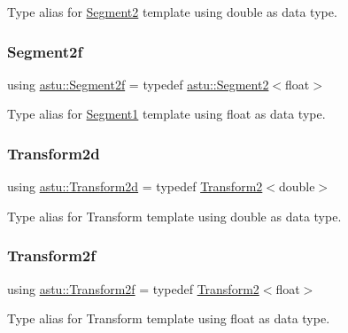 Type alias for \hyperlink{classastu_1_1Segment2}{Segment2} template using double as data type. \mbox{\label{group__math__group_gab93de73c36660369f18786b88125e902}} 
\subsubsection{\texorpdfstring{Segment2f}{Segment2f}}
{\footnotesize\ttfamily using \hyperlink{group__math__group_gab93de73c36660369f18786b88125e902}{astu\+::\+Segment2f} = typedef \hyperlink{classastu_1_1Segment2}{astu\+::\+Segment2}$<$float$>$}

Type alias for \hyperlink{classastu_1_1Segment1}{Segment1} template using float as data type. \mbox{\label{group__math__group_ga65979825a2f2857cba98d2d54a1df913}} 
\subsubsection{\texorpdfstring{Transform2d}{Transform2d}}
{\footnotesize\ttfamily using \hyperlink{group__math__group_ga65979825a2f2857cba98d2d54a1df913}{astu\+::\+Transform2d} = typedef \hyperlink{classastu_1_1Transform2}{Transform2}$<$double$>$}

Type alias for Transform template using double as data type. \mbox{\label{group__math__group_gac67b5e9d27308a01ea8190ecb15e08fa}} 
\subsubsection{\texorpdfstring{Transform2f}{Transform2f}}
{\footnotesize\ttfamily using \hyperlink{group__math__group_gac67b5e9d27308a01ea8190ecb15e08fa}{astu\+::\+Transform2f} = typedef \hyperlink{classastu_1_1Transform2}{Transform2}$<$float$>$}

Type alias for Transform template using float as data type. 